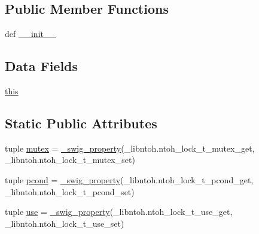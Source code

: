 \subsection*{Public Member Functions}
\begin{DoxyCompactItemize}
\item 
def \hyperlink{classlibntoh_1_1ntoh__lock__t_ac775ee34451fdfa742b318538164070e}{\-\_\-\-\_\-init\-\_\-\-\_\-}
\end{DoxyCompactItemize}
\subsection*{Data Fields}
\begin{DoxyCompactItemize}
\item 
\hyperlink{classlibntoh_1_1ntoh__lock__t_a05c09a5e9d53fa7adf0a7936038c2fa3}{this}
\end{DoxyCompactItemize}
\subsection*{Static Public Attributes}
\begin{DoxyCompactItemize}
\item 
tuple \hyperlink{classlibntoh_1_1ntoh__lock__t_a8f7d48b1501f5673c6742b61e778ce01}{mutex} = \hyperlink{namespacelibntoh_ae6f5626f776538e0cdb00e75ca1c96c9}{\-\_\-swig\-\_\-property}(\-\_\-libntoh.\-ntoh\-\_\-lock\-\_\-t\-\_\-mutex\-\_\-get, \-\_\-libntoh.\-ntoh\-\_\-lock\-\_\-t\-\_\-mutex\-\_\-set)
\item 
tuple \hyperlink{classlibntoh_1_1ntoh__lock__t_a23a951c27c097e73988ca76b59fd56c2}{pcond} = \hyperlink{namespacelibntoh_ae6f5626f776538e0cdb00e75ca1c96c9}{\-\_\-swig\-\_\-property}(\-\_\-libntoh.\-ntoh\-\_\-lock\-\_\-t\-\_\-pcond\-\_\-get, \-\_\-libntoh.\-ntoh\-\_\-lock\-\_\-t\-\_\-pcond\-\_\-set)
\item 
tuple \hyperlink{classlibntoh_1_1ntoh__lock__t_a8f0e3ca01e3f2f394c20647dcc7abd23}{use} = \hyperlink{namespacelibntoh_ae6f5626f776538e0cdb00e75ca1c96c9}{\-\_\-swig\-\_\-property}(\-\_\-libntoh.\-ntoh\-\_\-lock\-\_\-t\-\_\-use\-\_\-get, \-\_\-libntoh.\-ntoh\-\_\-lock\-\_\-t\-\_\-use\-\_\-set)
\end{DoxyCompactItemize}


